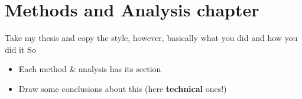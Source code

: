\chapter{Methods and Analysis chapter}
Take my thesis and copy the style, however, basically what you did and how you did it 
So 
\begin{itemize}
    \item Each method & analysis has its section
    \item Draw some conclusions about this (here \textbf{technical} ones!)
\end{itemize}

